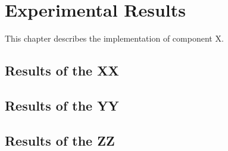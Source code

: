 \chapter{Experimental Results\label{cha:chapter5}}
This chapter describes the implementation of component X.

\section{Results of the XX\label{sec:ch5xx}}

\section{Results of the YY\label{sec:ch5yy}}

\section{Results of the ZZ\label{sec:ch5zz}}